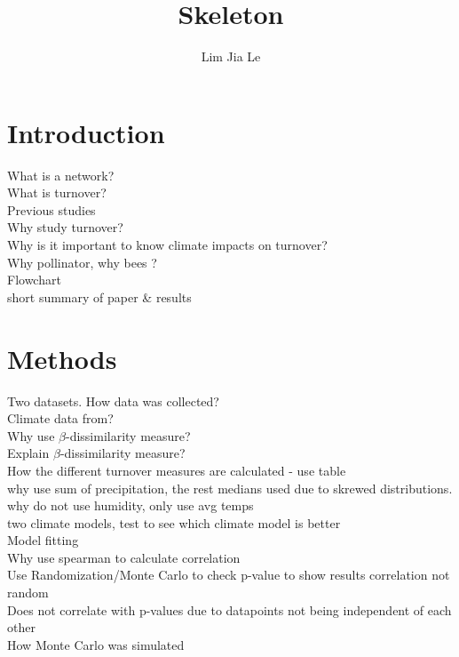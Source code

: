 \documentclass[11pt]{article}
\title{\textbf{\LARGE{Skeleton}}}
\date{}
\author{%
\large{Lim Jia Le}
}
\makeatletter
\renewcommand{\maketitle}{\bgroup\setlength{\parindent}{0pt}
\begin{flushleft}
  \textbf{\@title} %

  \@author
\end{flushleft}\egroup
}
\makeatother
\begin{document}
\maketitle
\smallskip
\tableofcontents


\section{Introduction} %
What is a network? \\
What is turnover? \\
Previous studies \\
Why study turnover? \\
Why is it important to know climate impacts on turnover? \\
Why pollinator, why bees ? \\
Flowchart \\
short summary of paper \& results \\

\section{Methods} %
Two datasets. How data was collected?\\
Climate data from? \\
Why use $\beta$-dissimilarity measure? \\
Explain $\beta$-dissimilarity measure? \\
How the different turnover measures are calculated - use table \\
why use sum of precipitation, the rest medians used due to skrewed distributions. \\
why do not use humidity, only use avg temps \\
two climate models, test to see which climate model is better \\
Model fitting\\
Why use spearman to calculate correlation \\
Use Randomization/Monte Carlo to check p-value to show results correlation not random \\
Does not correlate with p-values due to datapoints not being independent of each other\\
How Monte Carlo was simulated \\
\end{document}
